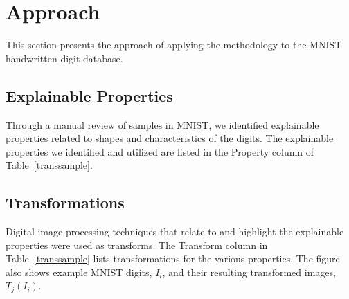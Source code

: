 \documentclass[conference]{IEEEtran}
\begin{document}
\section{Approach}

This section presents the approach of applying the methodology to the MNIST handwritten digit database. 

\subsection{Explainable Properties}

Through a manual review of samples in MNIST, we identified explainable properties related to shapes and characteristics of the digits.  The explainable properties we identified and utilized are listed in the Property column of Table~\ref{transsample}.

\subsection{Transformations}
 
Digital image processing techniques that relate to and highlight the explainable properties were used as transforms.  The Transform column in Table~\ref{transsample} lists transformations for the various properties.  The figure also shows example MNIST digits, $I_i$, and their resulting transformed images, $T_j(I_i)$.
\end{document}
